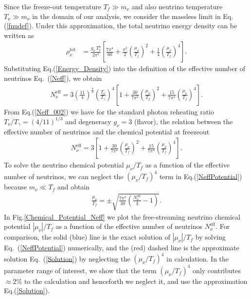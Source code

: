 Since the freeze-out temperature $T_f\gg m_\nu$ and also neutrino temperature $T_\nu\gg m_\nu$ in the domain of our analysis, we consider the massless limit in Eq.\;(\ref{fnudef}). Under this approximation, the total neutrino energy density can be written as
\begin{align}
\label{Energy_Density}
\rho_\nu^{\mathrm{tot}}
&=\frac{g_\nu\,T_\nu^4}{2\pi^2}\left[\frac{7\pi^4}{60}+\frac{\pi^2}{2}\left(\frac{\mu_\nu}{T_f}\right)^{\!\!2}+\frac{1}{4}\left(\frac{\mu_\nu}{T_f}\right)^{\!\!4}\right].
\end{align}
Substituting Eq.\;(\ref{Energy_Density}) into the definition of the effective number of neutrinos Eq.~(\ref{Neff}), we obtain 
\begin{align}
\label{Neff_002}
N_\nu^{\mathrm{eff}}\!\!
=\!3\!\left(\frac{11}{4}\right)^{\!\!\frac{4}{3}}\!\!\left(\frac{T_\nu}{T_\gamma}\right)^{\!\!4}\!
\left[1\!+\!\frac{30}{7\pi^2}\!\!\left(\frac{\mu_\nu}{T_f}\right)^{\!\!2} 
\!\!+\frac{15}{7\pi^4}\!\!\left(\frac{\mu_\nu}{T_f}\right)^{\!\!4}\right].
\end{align}
From Eq.\;(\ref{Neff_002}) we have for the standard photon reheating ratio $T_\nu/T_\gamma=(4/11)^{1/3}$ \cite{Kolb:1990vq} and degeneracy $g_\nu=3$ (flavor), the relation between the effective number of neutrinos and the chemical potential at freezeout
\begin{align}
\label{NeffPotential}
N_\nu^{\mathrm{eff}}=3\left[1+\frac{30}{7\pi^2}\left(\frac{\mu_\nu}{T_f}\right)^{\!\!2}+ \frac{15}{7\pi^4} \left(\frac{\mu_\nu}{T_f}\right)^{\!\!4}\right].
\end{align}
To solve the neutrino chemical potential $\mu_\nu/T_f$ as a function of the effective number of neutrinos, we can neglect the $(\mu_\nu/T_f)^4$ term in Eq.\;(\ref{NeffPotential}) because $m_\nu\ll T_f$ and obtain
\begin{align}\label{Solution}
\frac{\mu_\nu}{T_f}=\pm\sqrt{\frac{7\pi^2}{30}\left(\frac{N_\nu^{\mathrm{eff}}}{3}-1\right)}.
\end{align}
In Fig.\;\ref{Chemical_Potential_Neff} we plot the free-streaming neutrino chemical potential $|\mu_\nu|/T_f$ as a function of the effective number of neutrinos $N_\nu^{\mathrm{eff}}$. For comparison, the solid (blue) line is the exact solution of $|\mu_\nu|/T_f$ by solving Eq.~(\ref{NeffPotential}) numerically, and the (red) dashed line is the approximate solution Eq.~(\ref{Solution}) by neglecting the $(\mu_\nu/T_f)^4$ in calculation. In the parameter range of interest, we show that the term $(\mu_\nu/T_f)^4$ only contributes $\approx 2\%$ to the calculation and henceforth we neglect it, and use the approximation Eq.\;(\ref{Solution}). 

